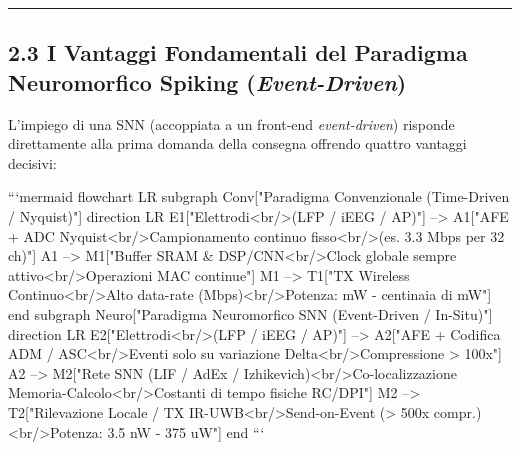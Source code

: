 \documentclass[11pt,a4paper]{article}
\begin{document}
\bigskip\hrule\bigskip

\subsection{2.3 I Vantaggi Fondamentali del Paradigma Neuromorfico Spiking (\textit{Event-Driven})}

L'impiego di una SNN (accoppiata a un front-end \textit{event-driven}) risponde direttamente alla prima domanda della consegna offrendo quattro vantaggi decisivi:

```mermaid
flowchart LR
subgraph Conv["Paradigma Convenzionale (Time-Driven / Nyquist)"]
direction LR
E1["Elettrodi<br/>(LFP / iEEG / AP)"] --> A1["AFE + ADC Nyquist<br/>Campionamento continuo fisso<br/>(es. 3.3 Mbps per 32 ch)"]
A1 --> M1["Buffer SRAM \& DSP/CNN<br/>Clock globale sempre attivo<br/>Operazioni MAC continue"]
M1 --> T1["TX Wireless Continuo<br/>Alto data-rate (Mbps)<br/>Potenza: mW - centinaia di mW"]
end
subgraph Neuro["Paradigma Neuromorfico SNN (Event-Driven / In-Situ)"]
direction LR
E2["Elettrodi<br/>(LFP / iEEG / AP)"] --> A2["AFE + Codifica ADM / ASC<br/>Eventi solo su variazione Delta<br/>Compressione > 100x"]
A2 --> M2["Rete SNN (LIF / AdEx / Izhikevich)<br/>Co-localizzazione Memoria-Calcolo<br/>Costanti di tempo fisiche RC/DPI"]
M2 --> T2["Rilevazione Locale / TX IR-UWB<br/>Send-on-Event (> 500x compr.)<br/>Potenza: 3.5 nW - 375 uW"]
end
```
\end{document}
